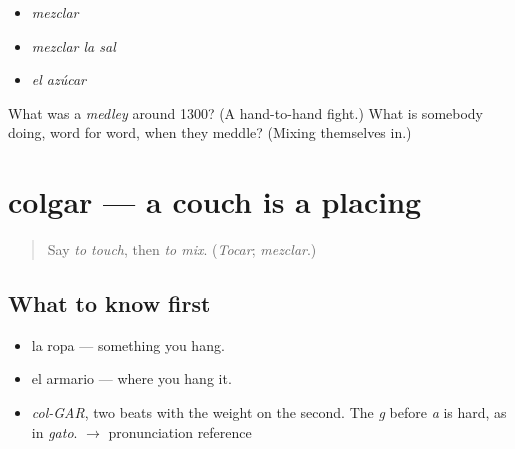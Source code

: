 \begin{itemize}
\raggedright
  \item \emph{mezclar}
  \item \emph{mezclar la sal}
  \item \emph{el azúcar}
\end{itemize}

\begin{tcolorbox}[breakable,colback=teal!4,colframe=teal!35!black,title={Before you move on}]
What was a \emph{medley} around 1300? (A hand-to-hand fight.) What is somebody doing, word for word, when they meddle? (Mixing themselves in.)
\end{tcolorbox}
\section[colgar]{colgar — a couch is a placing}

\label{lesson:ES-C385-colgar}



\begin{quote}
Say \emph{to touch}, then \emph{to mix}. (\emph{Tocar}; \emph{mezclar}.)
\end{quote}

\subsection*{What to know first}
\begin{itemize}
\raggedright
  \item la ropa — something you hang.
  \item el armario — where you hang it.
\end{itemize}

\begin{sounds}
\begin{itemize}
\raggedright
  \item \emph{col-GAR}, two beats with the weight on the second. The \emph{g} before \emph{a} is hard, as in \emph{gato}. $\to$ pronunciation reference
\end{itemize}
\end{sounds}

